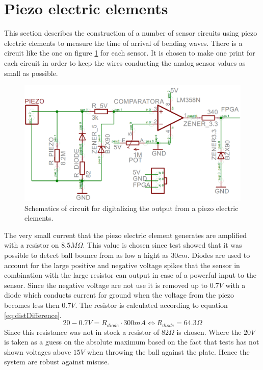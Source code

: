 \section{Piezo electric elements}
\label{piezo}
This section describes the construction of a number of sensor circuits using piezo electric elements to measure the time of arrival of bending waves.
There is a circuit like the one on figure \ref{fig:print} for each sensor. It is chosen to make one print for each circuit in order to keep the wires conducting the analog sensor values as small as possible. 
\begin{figure}[htb]
	\centering
	\includegraphics[width=1.\textwidth]{figures/Print}
	\caption{Schematics of circuit for digitalizing the output from a piezo electric elements.}
	\label{fig:print}
\end{figure}
The very small current that the piezo electric element generates are amplified with a resistor on $8.5M\Omega$. This value is chosen since test showed that it was possible to detect ball bounce from as low a hight as $30\si{cm}$.
Diodes are used to account for the large positive and negative voltage spikes that the sensor in combination with the large resistor can output in case of a powerful input to the sensor. 
Since the negative voltage are not use it is removed up to $0.7V$ with a diode which conducts current for ground when the voltage from the piezo becomes less then $0.7V$.
The resistor is calculated according to equation \ref{eq:distDifference}.
\begin{equation}
 20 - 0.7 V = R_{diode} \cdot 300mA \Leftrightarrow R_{diode} = 64.3\Omega 
 \label{diodeResistor}
\end{equation}
Since this resistance was not in stock a resistor of $82 \si{\Omega}$ is chosen.
Where the $20V$ is taken as a guess on the absolute maximum based on the fact that tests has not shown voltages above $15V$ when throwing the ball against the plate. Hence the system are robust against misuse.
